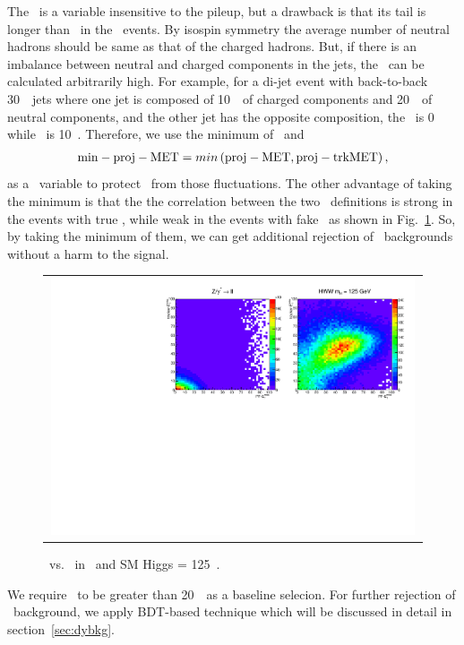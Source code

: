 The \trkmet\ is a variable insensitive to the pileup, 
but a drawback is that its tail is longer than \pfmet\ in the \dyll\ events. 
By isospin symmetry the average number of neutral hadrons should 
be same as that of the charged hadrons. But, if there is an imbalance between neutral 
and charged components in the jets, the \trkmet\ can be calculated arbitrarily high. 
For example, for a di-jet event with back-to-back 30~\GeV\ jets where one jet is composed 
of 10~\GeV\ of charged components and 20~\GeV\ of neutral components, and the other jet 
has the opposite composition, the \pfmet\ is 0 while \trkmet\ is 10~\GeV. 
Therefore, we use the minimum of \pfmet\ and \trkmet\, 
\begin{eqnarray} 
\mathrm{min-proj-MET} = min \left( \mathrm{proj-MET}, \mathrm{proj-trkMET} \right), 
\end{eqnarray} 
as a \met\ variable to protect \trkmet\ from those fluctuations. 
The other advantage of taking the minimum is that the the correlation 
between the two \met\ definitions is strong in the events with true \met, 
while weak in the events with fake \met\ as shown in Fig.~\ref{fig:2dmet}. 
So, by taking the minimum of them, we can get additional rejection 
of \dyll\ backgrounds without a harm to the signal.  
%
\begin{figure}[htp] 
\centering 
\begin{tabular}{c} 
\includegraphics[width=0.99\textwidth]{figures/2dmet.pdf} 
\end{tabular} 
\caption{\pmet\ vs. \ptrkmet\ in \dyll\ and SM Higgs \mHi = 125~\GeV.}
\label{fig:2dmet} 
\end{figure}  

We require \minpmet\ to be greater than 20~\GeV\ as a baseline selecion. 
For further rejection of \dyll\ background, we apply BDT-based technique which will be 
discussed in detail in section~\ref{sec:dybkg}. 

